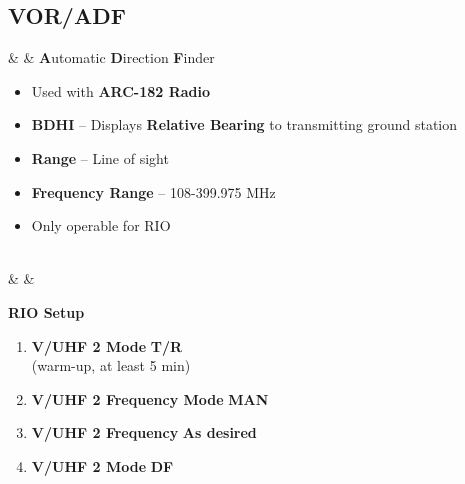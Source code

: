 \documentclass[fontInter]{TechCheck}
\begin{document}
	\subsection{VOR/ADF}
	\begin{listlongtable}
		\textbf{\textbullet} &  & \textbf{A}utomatic \textbf{D}irection \textbf{F}inder

		\begin{minipage}[t]{\linewidth}
			\begin{itemize}
				\item Used with \textbf{ARC-182 Radio}
				\item \textbf{BDHI} -- Displays \textbf{Relative Bearing} to transmitting ground station
				\item \textbf{Range} -- Line of sight
				\item \textbf{Frequency Range} -- 108-399.975 MHz
				\item Only operable for RIO
			\end{itemize}
		\end{minipage} \\
		\midrule
		\textbf{\textbullet} &  &
		\begin{minipage}[t]{\linewidth}
			\vspace{-7pt}
			\textbf{RIO Setup}
			\begin{enumerate}
				\item \textbf{V/UHF 2 Mode} \dotfill \textbf{T/R} \\
				\hfill (warm-up, at least 5 min)
				\item \textbf{V/UHF 2 Frequency Mode} \dotfill \textbf{MAN}
				\item \textbf{V/UHF 2 Frequency} \dotfill \textbf{As desired}
				\item \textbf{V/UHF 2 Mode} \dotfill \textbf{DF}
			\end{enumerate}
		\end{minipage} \\
	\end{listlongtable}


	\clearpage
\end{document}
